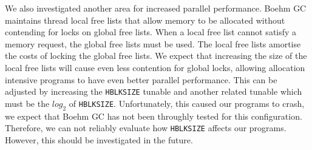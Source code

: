 We also investigated another area for increased parallel performance.
Boehm GC maintains thread local free lists that allow memory to be allocated
without contending for locks on global free lists.
When a local free list cannot satisfy a memory request, the global free
lists must be used.
The local free lists amortise the costs of locking the global free lists.
We expect that increasing the size of the local free lists will cause even
less contention for global locks,
allowing allocation intensive programs to have even better parallel
performance.
This can be adjusted by increasing the \texttt{HBLKSIZE} tunable and another
related tunable which must be the $log_2$ of \texttt{HBLKSIZE}.
Unfortunately,
this caused our programs to crash,
we expect that Boehm GC has not been throughly tested for this
configuration.
Therefore, we can not reliably evaluate how \texttt{HBLKSIZE} affects our
programs.
However,
this should be investigated in the future.

